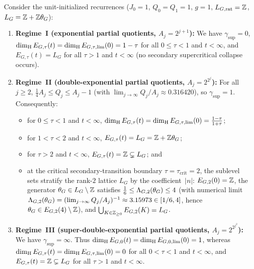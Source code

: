 \begin{corollary}[Three canonical growth regimes and the critical boundary $\tau_{\mathrm{crit}}=2$]\label{cor:growing-rec-three-regimes}
Consider the unit-initialized recurrences ($J_0=1$, $Q_0=Q_1=1$, $g=1$,
$L_{G,\mathrm{rat}}=\mathbb{Z}$, $L_G=\mathbb{Z}+\mathbb{Z}\theta_G$):
\begin{enumerate}[label=(\roman*),leftmargin=2.2em]
\item \textbf{Regime~I (exponential partial quotients, $A_j=2^{j+1}$):}
We have $\gamma_{\sup}=0$, $\dim_{\mathrm{H}} E_{G,\tau}(t)=\dim_{\mathrm{H}} E_{G,\tau,\mathrm{lim}}(0)=1-\tau$
for all $0\le\tau<1$ and $t<\infty$, and $E_{G,\tau}(t)=L_G$ for all $\tau>1$ and $t<\infty$
(no secondary supercritical collapse occurs).
\item \textbf{Regime~II (double-exponential partial quotients, $A_j=2^{2^j}$):}
For all $j\ge2$, $\frac14 A_j\le Q_j\le A_j-1$ (with $\lim_{j\to\infty}Q_j/A_j\approx0.316420$),
so $\gamma_{\sup}=1$. Consequently:
\begin{itemize}[leftmargin=1.5em]
\item for $0\le\tau<1$ and $t<\infty$, $\dim_{\mathrm{H}} E_{G,\tau}(t)=\dim_{\mathrm{H}} E_{G,\tau,\mathrm{lim}}(0)=\frac{1-\tau}{1+\tau}$;
\item for $1<\tau<2$ and $t<\infty$, $E_{G,\tau}(t)=L_G=\mathbb{Z}+\mathbb{Z}\theta_G$;
\item for $\tau>2$ and $t<\infty$, $E_{G,\tau}(t)=\mathbb{Z}\subsetneq L_G$; and
\item at the critical secondary-transition boundary $\tau=\tau_{\mathrm{crit}}=2$,
the sublevel sets stratify the rank-$2$ lattice $L_G$ by the coefficient~$|n|$:
$E_{G,2}(0)=\mathbb{Z}$, the generator $\theta_G\in L_G\setminus\mathbb{Z}$ satisfies
$\frac16\le\Lambda_{G,2}(\theta_G)\le 4$ (with numerical limit
$\Lambda_{G,2}(\theta_G)=(\lim_{j\to\infty}Q_j/A_j)^{-1}\approx3.15973\in[1/6,4]$, hence
$\theta_G\in E_{G,2}(4)\setminus\mathbb{Z}$), and $\bigcup_{K\in\mathbb{Z}_{\ge0}}E_{G,2}(K)=L_G$.
\end{itemize}
\item \textbf{Regime~III (super-double-exponential partial quotients, $A_j=2^{2^{j^2}}$):}
We have $\gamma_{\sup}=\infty$. Thus $\dim_{\mathrm{H}} E_{G,0}(t)=\dim_{\mathrm{H}} E_{G,0,\mathrm{lim}}(0)=1$,
whereas $\dim_{\mathrm{H}} E_{G,\tau}(t)=\dim_{\mathrm{H}} E_{G,\tau,\mathrm{lim}}(0)=0$ for all $0<\tau<1$
and $t<\infty$, and $E_{G,\tau}(t)=\mathbb{Z}\subsetneq L_G$ for all $\tau>1$ and $t<\infty$.
\end{enumerate}
\end{corollary}

